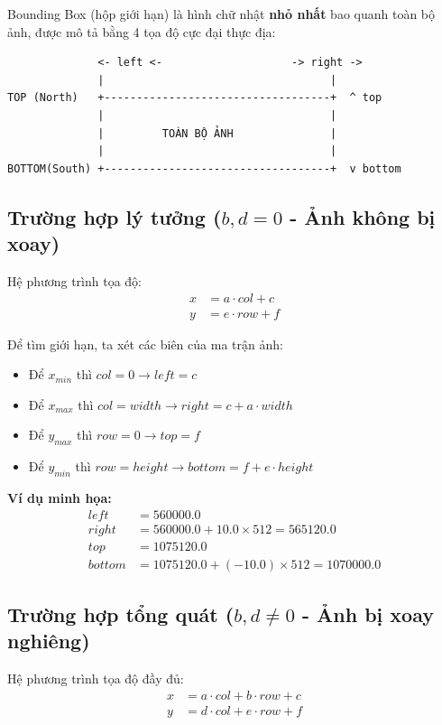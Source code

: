 \documentclass[12pt,a4paper]{report}
\begin{document}
Bounding Box (hộp giới hạn) là hình chữ nhật \textbf{nhỏ nhất} bao quanh toàn bộ ảnh, được mô tả bằng 4 tọa độ cực đại thực địa:

\begin{verbatim}
              <- left <-                    -> right ->
              |                                   |
TOP (North)   +-----------------------------------+  ^ top
              |                                   |
              |         TOÀN BỘ ẢNH               |
              |                                   |
BOTTOM(South) +-----------------------------------+  v bottom
\end{verbatim}

\subsection{Trường hợp lý tưởng ($b, d = 0$ - Ảnh không bị xoay)}
Hệ phương trình tọa độ:
\begin{align*}
 x &= a \cdot col + c \\
 y &= e \cdot row + f
\end{align*}

Để tìm giới hạn, ta xét các biên của ma trận ảnh:
\begin{itemize}
    \item Để $x_{min}$ thì $col = 0 \rightarrow left = c$
    \item Để $x_{max}$ thì $col = width \rightarrow right = c + a \cdot width$
    \item Để $y_{max}$ thì $row = 0 \rightarrow top = f$
    \item Để $y_{min}$ thì $row = height \rightarrow bottom = f + e \cdot height$
\end{itemize}

\textbf{Ví dụ minh họa:}
\begin{align*}
left &= 560000.0 \\
right &= 560000.0 + 10.0 \times 512 = 565120.0 \\
top &= 1075120.0 \\
bottom &= 1075120.0 + (-10.0) \times 512 = 1070000.0
\end{align*}

\subsection{Trường hợp tổng quát ($b, d \neq 0$ - Ảnh bị xoay nghiêng)}
Hệ phương trình tọa độ đầy đủ:
\begin{align*}
 x &= a \cdot col + b \cdot row + c \\
 y &= d \cdot col + e \cdot row + f
\end{align*}
\end{document}
